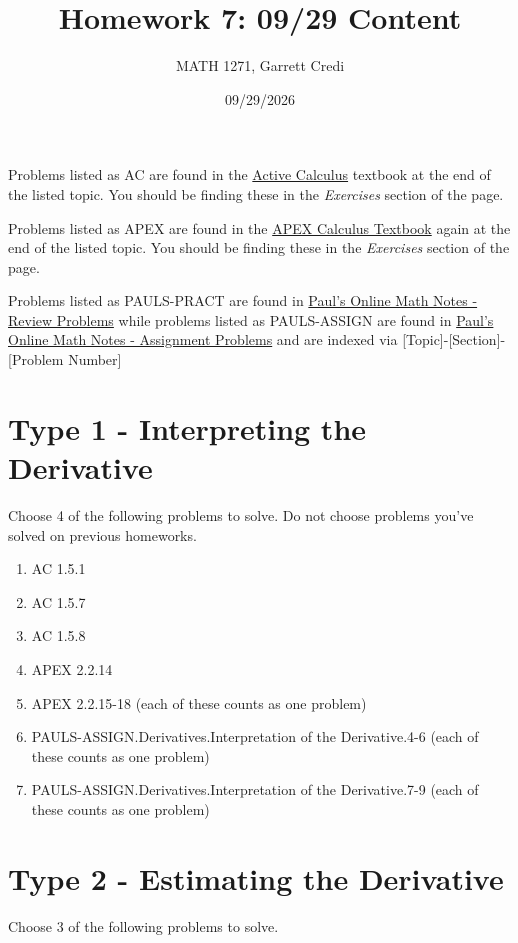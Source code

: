 \documentclass[12pt]{article}
\title{Homework 7: 09/29 Content}
\author{MATH 1271, Garrett Credi}
\date{09/29/2026}
\begin{document}
\maketitle

Problems listed as AC are found in the \href{https://activecalculus.org/single1e/frontmatter.html}{Active Calculus} 
textbook at the end of the listed topic. You should be finding these in the \textit{Exercises} section of the page.

Problems listed as APEX are found in the \href{https://opentext.uleth.ca/apex-calculus/apex-calculus.html}{APEX Calculus Textbook}
again at the end of the listed topic. You should be finding these in the \textit{Exercises} section of the page.

Problems listed as PAULS-PRACT are found in \href{https://tutorial.math.lamar.edu/Problems/CalcI/CalcI.aspx}{Paul's Online Math Notes - Review Problems}
while problems listed as PAULS-ASSIGN are found in \href{https://tutorial.math.lamar.edu/ProblemsNS/CalcI/CalcI.aspx}{Paul's Online Math Notes - Assignment Problems}
and are indexed via [Topic]-[Section]-[Problem Number]

\section{Type 1 - Interpreting the Derivative}

Choose 4 of the following problems to solve. Do not choose problems you've solved on previous homeworks.

\begin{enumerate}
  \item AC 1.5.1
  \item AC 1.5.7
  \item AC 1.5.8
  \item APEX 2.2.14
  \item APEX 2.2.15-18 (each of these counts as one problem)
  \item PAULS-ASSIGN.Derivatives.Interpretation of the Derivative.4-6 (each of these counts as one problem)
  \item PAULS-ASSIGN.Derivatives.Interpretation of the Derivative.7-9 (each of these counts as one problem)
\end{enumerate}

\section{Type 2 - Estimating the Derivative}
Choose 3 of the following problems to solve.
\end{document}
